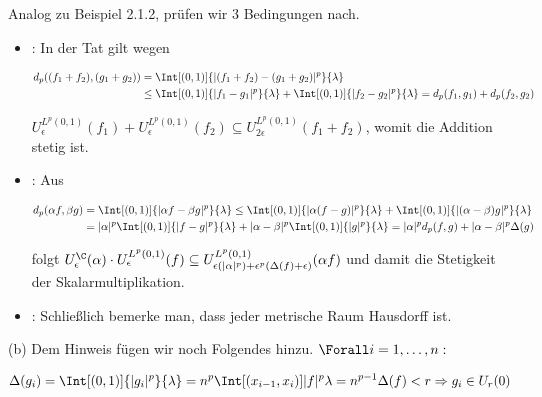\begin{solution}
\begin{enumerate}[label = (\roman*)]
\end{enumerate}

Analog zu Beispiel 2.1.2, prüfen wir 3 Bedingungen nach.

\begin{itemize}

  \item
  :
  In der Tat gilt wegen

  \begin{align*}
    d_p((f_1 + f_2), (g_1 + g_2))
    & =
    \Int[(0, 1)]{|(f_1 + f_2) - (g_1 + g_2)|^p}{\lambda} \\
    & \leq
    \Int[(0, 1)]{|f_1  - g_1|^p}{\lambda} +
    \Int[(0, 1)]{|f_2  - g_2|^p}{\lambda}
    =
    d_p(f_1, g_1) + d_p(f_2, g_2)
  \end{align*}

  $U_\epsilon^{L^p(0, 1)}(f_1) + U_\epsilon^{L^p(0, 1)}(f_2) \subseteq U_{2 \epsilon}^{L^p(0, 1)}(f_1 + f_2)$, womit die Addition stetig ist.

  \item
  :
  Aus

  \begin{align*}
    d_p(\alpha f, \beta g)
    & =
    \Int[(0, 1)]{|\alpha f - \beta g|^p}{\lambda}
    \leq
    \Int[(0, 1)]{|\alpha (f - g)|^p}{\lambda} +
    \Int[(0, 1)]{|(\alpha - \beta) g|^p}{\lambda} \\
    & =
    |\alpha|^p
    \Int[(0, 1)]{|f - g|^p}{\lambda} +
    |\alpha - \beta|^p
    \Int[(0, 1)]{|g|^p}{\lambda}
    =
    |\alpha|^p
    d_p(f, g) +
    |\alpha - \beta|^p
    \Delta(g)
  \end{align*}

  folgt $U_\epsilon^\C(\alpha) \cdot U_\epsilon^{L^p(0, 1)}(f) \subseteq U_{\epsilon (|\alpha|^p) + \epsilon^p (\Delta(f) + \epsilon)}^{L^p(0, 1)}(\alpha f)$ und damit die Stetigkeit der Skalarmultiplikation.

  \item
  :
  Schließlich bemerke man, dass jeder metrische Raum Hausdorff ist.

\end{itemize}

(b)
Dem Hinweis fügen wir noch Folgendes hinzu. $\Forall i = 1, \ldots, n:$

\begin{align*}
  \Delta(g_i)
  =
  \Int[(0, 1)]{|g_i|^p}{\lambda}
  =
  n^p
  \Int[(x_{i-1}, x_i)]{|f|^p}{\lambda}
  =
  n^{p-1} \Delta(f) < r
  \Rightarrow
  g_i \in U_r(0)
\end{align*}


\end{solution}
